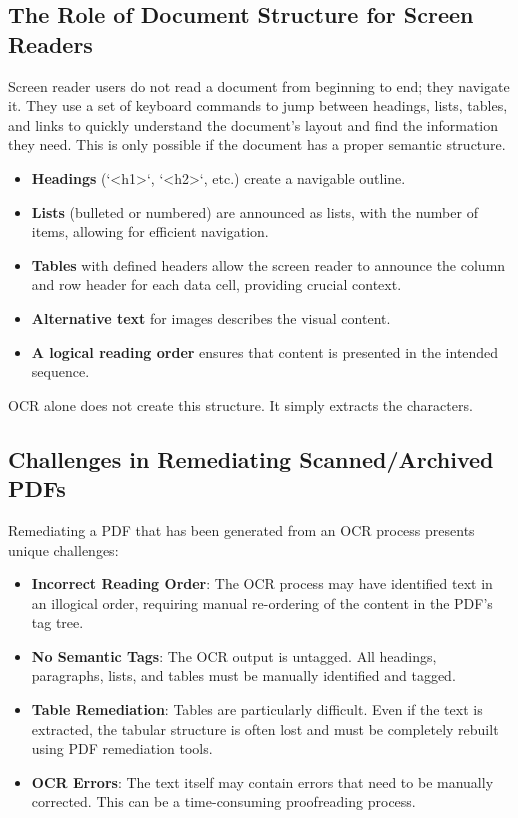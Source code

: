 \subsection{The Role of Document Structure for Screen Readers}
\label{subsec:ocr-document-structure}
Screen reader users do not read a document from beginning to end; they navigate it. They use a set of keyboard commands to jump between headings, lists, tables, and links to quickly understand the document's layout and find the information they need. This is only possible if the document has a proper semantic structure.
\begin{itemize}
	\item \textbf{Headings} (`<h1>`, `<h2>`, etc.) create a navigable outline.
	\item \textbf{Lists} (bulleted or numbered) are announced as lists, with the number of items, allowing for efficient navigation.
	\item \textbf{Tables} with defined headers allow the screen reader to announce the column and row header for each data cell, providing crucial context.
	\item \textbf{Alternative text} for images describes the visual content.
	\item \textbf{A logical reading order} ensures that content is presented in the intended sequence.
\end{itemize}
OCR alone does not create this structure. It simply extracts the characters.

\subsection{Challenges in Remediating Scanned/Archived PDFs}
\label{subsec:ocr-remediating-pdfs}
Remediating a PDF that has been generated from an OCR process presents unique challenges:
\begin{itemize}
	\item \textbf{Incorrect Reading Order}: The OCR process may have identified text in an illogical order, requiring manual re-ordering of the content in the PDF's tag tree.
	\item \textbf{No Semantic Tags}: The OCR output is untagged. All headings, paragraphs, lists, and tables must be manually identified and tagged.
	\item \textbf{Table Remediation}: Tables are particularly difficult. Even if the text is extracted, the tabular structure is often lost and must be completely rebuilt using PDF remediation tools.
	\item \textbf{OCR Errors}: The text itself may contain errors that need to be manually corrected. This can be a time-consuming proofreading process.
\end{itemize}

